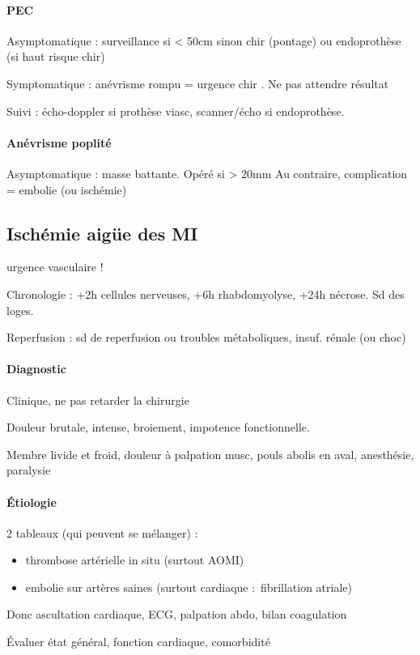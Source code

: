 \paragraph{PEC}
Asymptomatique : surveillance si \diameter < 50cm sinon chir (pontage) ou
endoprothèse (si haut risque chir)

Symptomatique : \danger anévrisme rompu = urgence chir \danger. Ne pas attendre
résultat

Suivi : écho-doppler si prothèse viasc, scanner/écho si endoprothèse.

\paragraph{Anévrisme poplité}
Asymptomatique : masse battante. Opéré si > 20mm
Au contraire, complication = embolie (ou ischémie)

\subsection{Ischémie aigüe des MI}
\danger urgence vasculaire !

Chronologie : +2h cellules nerveuses, +6h rhabdomyolyse, +24h nécrose. Sd des
loges.

Reperfusion : sd de reperfusion ou troubles métaboliques, insuf. rénale (ou
choc)

\paragraph{Diagnostic} Clinique, ne pas retarder la chirurgie \danger

Douleur brutale, intense, broiement, impotence fonctionnelle. 

Membre livide et froid, douleur à palpation musc, pouls abolis en aval, anesthésie, paralysie

\paragraph{Étiologie} 2 tableaux (qui peuvent se mélanger) :
\begin{itemize}
  \item thrombose artérielle in situ (surtout AOMI)
  \item embolie sur artères saines (surtout cardiaque : fibrillation atriale)
\end{itemize}
Donc ascultation cardiaque, ECG, palpation abdo, bilan coagulation

Évaluer état général, fonction cardiaque, comorbidité

